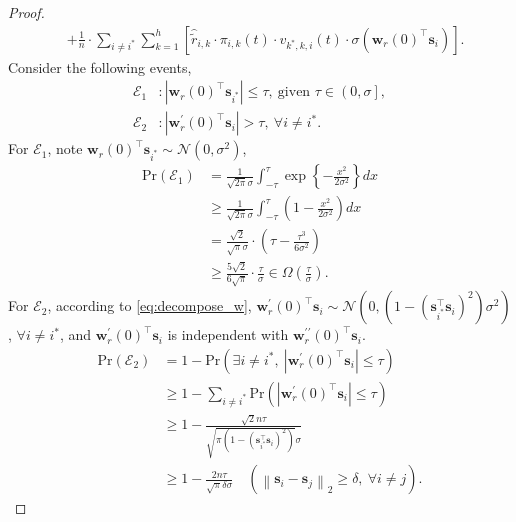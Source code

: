 \documentclass[10pt]{article}
\def\rvs{{\mathbf{s}}}
\def\rvw{{\mathbf{w}}}
\def\pr{{\text{Pr}}}
\def\gN{{\mathcal{N}}}
\def\gE{{\mathcal{E}}}
\begin{document}
\begin{proof}
\begin{equation}
\begin{split}
	&+ \frac{1}{n} \cdot \sum\limits_{i \not= i^*}{\sum\limits_{k=1}^{h}{ \left[ \hat{\tilde{r}}_{i,k} \cdot \pi_{i,k}(t) \cdot v_{k^*,k,i}(t) \cdot \sigma( \rvw_r(0)^\top \rvs_i ) \right] } }.
\end{split}
\end{equation}
Consider the following events,
\begin{equation*}
\begin{split}
	\gE_1 &: \left| \rvw_r(0)^\top \rvs_{i^*} \right| \le \tau, \ \text{given } \tau \in \left( 0, \sigma \right], \\
	\gE_2 &: \left| \rvw_r^\prime(0)^\top \rvs_i \right| > \tau, \ \forall i \not= i^*.
\end{split}
\end{equation*}
For $\gE_1$, note $\rvw_r(0)^\top \rvs_{i^*} \sim \gN(0, \sigma^2)$,
\begin{equation*}
\begin{split}
	\pr\left(\gE_1\right) &= \frac{1}{\sqrt{2\pi}\sigma} \int_{-\tau}^{\tau}{\exp\left\{ - \frac{x^2}{2\sigma^2} \right\} dx} \\
	&\ge \frac{1}{\sqrt{2\pi}\sigma} \int_{-\tau}^{\tau}{ \left( 1  - \frac{x^2}{2\sigma^2} \right) dx} \\
	&= \frac{\sqrt{2}}{\sqrt{\pi}\sigma} \cdot \left( \tau - \frac{\tau^3}{6\sigma^2}\right) \\
	&\ge \frac{5\sqrt{2}}{6\sqrt{\pi}} \cdot \frac{\tau}{\sigma} \in \Omega\left( \frac{\tau}{\sigma} \right).
\end{split}
\end{equation*}
For $\gE_2$, according to \cref{eq:decompose_w}, $\rvw_r^\prime(0)^\top \rvs_i \sim \gN\left(0, \left(1 - \left(\rvs_{i^*}^\top \rvs_{i} \right)^2 \right)\sigma^2 \right)$, $\forall i \not= i^*$, and $\rvw_r^\prime(0)^\top \rvs_i$ is independent with $\rvw_r^{\prime\prime}(0)^\top \rvs_{i}$.
\begin{equation*}
\begin{split}
	\pr\left(\gE_2\right) &= 1 - \pr\left( \exists i \not= i^*, \ \left| \rvw_r^\prime(0)^\top \rvs_i \right| \le \tau \right) \\
	&\ge 1 - \sum\limits_{i \not= i^*}{ \pr\left(\left| \rvw_r^\prime(0)^\top \rvs_i \right| \le \tau \right) } \\
	&\ge 1 - \frac{\sqrt{2}n\tau}{\sqrt{\pi\left( 1 - \left(\rvs_{i^*}^\top \rvs_{i} \right)^2 \right) }\sigma} \\
	&\ge 1 - \frac{2n\tau}{\sqrt{\pi}\delta\sigma} \quad \left( \left\| \rvs_{i} -  \rvs_{j} \right\|_2 \ge \delta, \ \forall i \not= j \right).

\end{split}
\end{equation*}
\end{proof}
\end{document}
